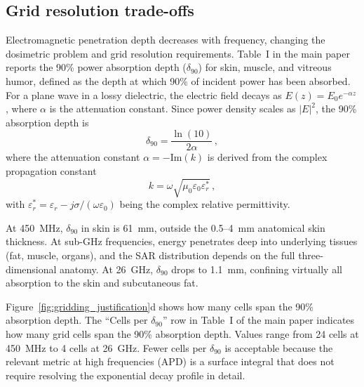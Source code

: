 \documentclass{iopjournal}
\begin{document}
\subsection{Grid resolution trade-offs}

Electromagnetic penetration depth decreases with frequency, changing the dosimetric problem and grid resolution requirements.
Table~I in the main paper reports the 90\% power absorption depth ($\delta_{90}$) for skin, muscle, and vitreous humor, defined as the depth at which 90\% of incident power has been absorbed.
For a plane wave in a lossy dielectric, the electric field decays as $E(z) = E_0 e^{-\alpha z}$, where $\alpha$ is the attenuation constant.
Since power density scales as $|E|^2$, the 90\% absorption depth is
\begin{equation}
\delta_{90} = \frac{\ln(10)}{2\alpha} \,,
\end{equation}
where the attenuation constant $\alpha = -\mathrm{Im}(k)$ is derived from the complex propagation constant
\begin{equation}
k = \omega\sqrt{\mu_0 \varepsilon_0 \varepsilon_r^*} \,,
\end{equation}
with $\varepsilon_r^* = \varepsilon_r - j\sigma/(\omega\varepsilon_0)$ being the complex relative permittivity.

At 450~MHz, $\delta_{90}$ in skin is 61~mm, outside the 0.5--4~mm anatomical skin thickness.
At sub-GHz frequencies, energy penetrates deep into underlying tissues (fat, muscle, organs), and the \gls{SAR} distribution depends on the full three-dimensional anatomy.
At 26~GHz, $\delta_{90}$ drops to 1.1~mm, confining virtually all absorption to the skin and subcutaneous fat.

Figure~\ref{fig:gridding_justification}d shows how many cells span the 90\% absorption depth.
The ``Cells per $\delta_{90}$'' row in Table~I of the main paper indicates how many grid cells span the 90\% absorption depth.
Values range from 24 cells at 450~MHz to 4 cells at 26~GHz.
Fewer cells per $\delta_{90}$ is acceptable because the relevant metric at high frequencies (APD) is a surface integral that does not require resolving the exponential decay profile in detail.
\end{document}
